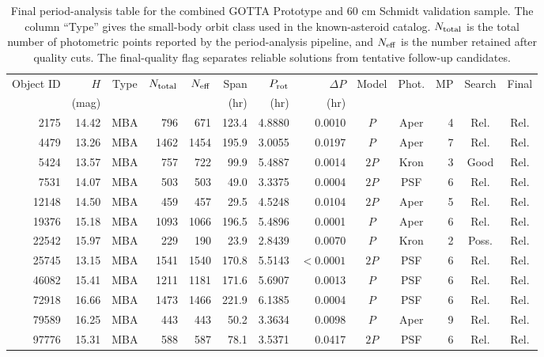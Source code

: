 \begin{table}[!p]
\centering
\caption{Final period-analysis table for the combined GOTTA Prototype and 60 cm Schmidt validation sample. The column ``Type'' gives the small-body orbit class used in the known-asteroid catalog. $N_{\rm total}$ is the total number of photometric points reported by the period-analysis pipeline, and $N_{\rm eff}$ is the number retained after quality cuts. The final-quality flag separates reliable solutions from tentative follow-up candidates.}
\label{tab:period_validation}
\scriptsize
\setlength{\tabcolsep}{2.5pt}
\renewcommand{\arraystretch}{1.12}
\begin{tabular}{r r c r r r r r c c r c c}
\toprule
Object ID & $H$ & Type & $N_{\rm total}$ & $N_{\rm eff}$ & Span & $P_{\rm rot}$ & $\Delta P$ & Model & Phot. & MP & Search & Final \\
          & (mag) &      &                   &                 & (hr) & (hr) & (hr) &       &       &    &        &       \\
\midrule
2175 & 14.42 & MBA & 796 & 671 & 123.4 & 4.8880 & 0.0010 & $P$ & Aper & 4 & Rel. & Rel. \\
4479 & 13.26 & MBA & 1462 & 1454 & 195.9 & 3.0055 & 0.0197 & $P$ & Aper & 7 & Rel. & Rel. \\
5424 & 13.57 & MBA & 757 & 722 & 99.9 & 5.4887 & 0.0014 & $2P$ & Kron & 3 & Good & Rel. \\
7531 & 14.07 & MBA & 503 & 503 & 49.0 & 3.3375 & 0.0004 & $2P$ & PSF & 6 & Rel. & Rel. \\
12148 & 14.50 & MBA & 459 & 457 & 29.5 & 4.5248 & 0.0104 & $2P$ & Aper & 5 & Rel. & Rel. \\
19376 & 15.18 & MBA & 1093 & 1066 & 196.5 & 5.4896 & 0.0001 & $P$ & Aper & 6 & Rel. & Rel. \\
22542 & 15.97 & MBA & 229 & 190 & 23.9 & 2.8439 & 0.0070 & $P$ & Kron & 2 & Poss. & Rel. \\
25745 & 13.15 & MBA & 1541 & 1540 & 170.8 & 5.5143 & $<0.0001$ & $2P$ & PSF & 6 & Rel. & Rel. \\
46082 & 15.41 & MBA & 1211 & 1181 & 171.6 & 5.6907 & 0.0013 & $P$ & PSF & 6 & Rel. & Rel. \\
72918 & 16.66 & MBA & 1473 & 1466 & 221.9 & 6.1385 & 0.0004 & $P$ & PSF & 6 & Rel. & Rel. \\
79589 & 16.25 & MBA & 443 & 443 & 50.2 & 3.3634 & 0.0098 & $P$ & Aper & 9 & Rel. & Rel. \\
97776 & 15.31 & MBA & 588 & 587 & 78.1 & 3.5371 & 0.0417 & $2P$ & PSF & 6 & Rel. & Rel. \\

\end{tabular}
\end{table}
